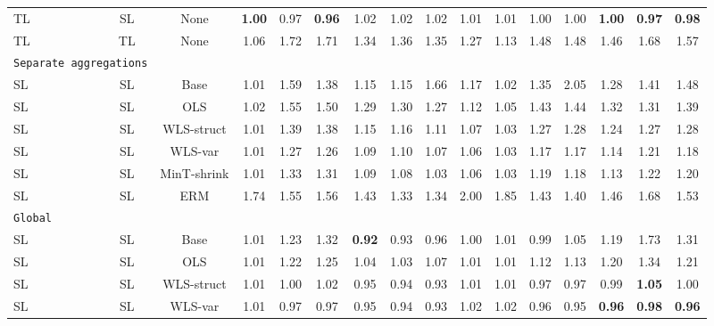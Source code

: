 \documentclass[preprint, 3p, times, twocolumn]{elsarticle}
\begin{document}
\begin{table}
\begin{center}
{\begin{tabular}{l c  cccccccccccccc}
    \hspace{0.1cm} 	TL	&SL	&None	&\textbf{1.00}	&0.97	&\textbf{0.96}	&1.02	&1.02	&1.02	&1.01	&1.01	&1.00	&1.00	&\textbf{1.00}	&\textbf{0.97}	&\textbf{0.98}	\\
    \hspace{0.1cm} 	TL	&TL	&None	&1.06	&1.72	&1.71	&1.34	&1.36	&1.35	&1.27	&1.13	&1.48	&1.48	&1.46	&1.68	&1.57	\\
    \midrule																	
    \multicolumn{2}{l}{\texttt{Separate aggregations}}																	\\
    \hspace{0.1cm} 	SL	&SL	&Base	&1.01	&1.59	&1.38	&1.15	&1.15	&1.66	&1.17	&1.02	&1.35	&2.05	&1.28	&1.41	&1.48	\\
    \hspace{0.1cm} 	SL	&SL	&OLS	&1.02	&1.55	&1.50	&1.29	&1.30	&1.27	&1.12	&1.05	&1.43	&1.44	&1.32	&1.31	&1.39	\\
    \hspace{0.1cm} 	SL	&SL	&WLS-struct	&1.01	&1.39	&1.38	&1.15	&1.16	&1.11	&1.07	&1.03	&1.27	&1.28	&1.24	&1.27	&1.28	\\
    \hspace{0.1cm} 	SL	&SL	&WLS-var	&1.01	&1.27	&1.26	&1.09	&1.10	&1.07	&1.06	&1.03	&1.17	&1.17	&1.14	&1.21	&1.18	\\
    \hspace{0.1cm} 	SL	&SL	&MinT-shrink	&1.01	&1.33	&1.31	&1.09	&1.08	&1.03	&1.06	&1.03	&1.19	&1.18	&1.13	&1.22	&1.20	\\
    \hspace{0.1cm} 	SL	&SL	&ERM	&1.74	&1.55	&1.56	&1.43	&1.33	&1.34	&2.00	&1.85	&1.43	&1.40	&1.46	&1.68	&1.53	\\
    \midrule																	
    \texttt{Global}																	\\
    \hspace{0.1cm} 	SL	&SL	&Base	&1.01	&1.23	&1.32	&\textbf{0.92}	&0.93	&0.96	&1.00	&1.01	&0.99	&1.05	&1.19	&1.73	&1.31	\\
    \hspace{0.1cm} 	SL	&SL	&OLS	&1.01	&1.22	&1.25	&1.04	&1.03	&1.07	&1.01	&1.01	&1.12	&1.13	&1.20	&1.34	&1.21	\\
    \hspace{0.1cm} 	SL	&SL	&WLS-struct	&1.01	&1.00	&1.02	&0.95	&0.94	&0.93	&1.01	&1.01	&0.97	&0.97	&0.99	&\textbf{1.05}	&1.00	\\
    \hspace{0.1cm} 	SL	&SL	&WLS-var	&1.01	&0.97	&0.97	&0.95	&0.94	&0.93	&1.02	&1.02	&0.96	&0.95	&\textbf{0.96}	&\textbf{0.98}	&\textbf{0.96}	\\

\end{tabular}}
\end{center}
\end{table}
\end{document}
